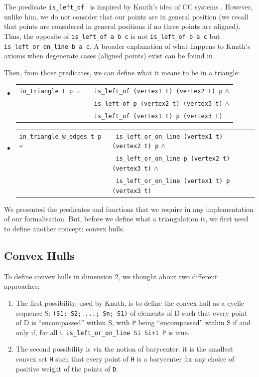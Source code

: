 \documentclass[a4paper,10pt]{article}
\def\ttt#1#2{{\tt{\color{black}#1} #2}}
\begin{document}
  The predicate \ttt{is\_left\_of}{} is inspired by Knuth's idea of CC systems \cite{Knuth92}.
  However, unlike him, we do not consider that our points are in general position (we recall that points are considered in general positions if no three points are aligned). Thus, the opposite of \ttt{is\_left\_of}{a b c} is not \ttt{is\_left\_of}{b a c} but \ttt{is\_left\_or\_on\_line}{b a c}. A broader explanation of what happens to Knuth's axioms when degenerate cases (aligned points) exist can be found in \cite{Hull}. \label{knuthpic}

  Then, from those predicates, we can define what it means to be in a triangle:
  \begin{itemize}
    \item \begin{tabular}{ll}
       \ttt {in\_triangle}{t p = }& \ttt{}{is\_left\_of (vertex1 t) (vertex2 t) p} $\wedge$\\
        &\ttt{}{is\_left\_of p (vertex2 t) (vertex3 t)} $\wedge$\\
  & \ttt{}{is\_left\_of (vertex1 t) p (vertex3 t)}
      \end{tabular}
\item \begin{tabular}{ll}
       \ttt{in\_triangle\_w\_edges t p}{= }& \ttt{}{is\_left\_or\_on\_line (vertex1 t) (vertex2 t) p} $\wedge$\\
        & \ttt{}{is\_left\_or\_on\_line p  (vertex2 t) (vertex3 t)} $\wedge$\\
  & \ttt{}{is\_left\_or\_on\_line (vertex1 t) p (vertex3 t)}
      \end{tabular}
      \end{itemize}

We presented the predicates and functions that we require in any implementation of our formalisation. But, before we define what a triangulation is, we first need to define another concept: convex hulls.
      
\subsection{Convex Hulls}


To define convex hulls in dimension 2, we thought about two different approaches:
\begin{enumerate}
\item The first possibility, used by Knuth,  is to define the convex hull as a cyclic sequence S: {\tt (S1; S2; ...; Sn; S1)} of elements of D such that every point of D is ``encompassed'' within S, with {\tt P} being ``encompassed'' within S if and only if, for all i,  {\tt is\_left\_or\_on\_line Si Si+1 P} is true.

\item The second possibility is via the notion of barycenter: it is the smallest convex set {\tt H} such that every point of {\tt H} is a barycenter for any choice of positive weight of the points of {\tt D}.
\end{enumerate}
\end{document}
